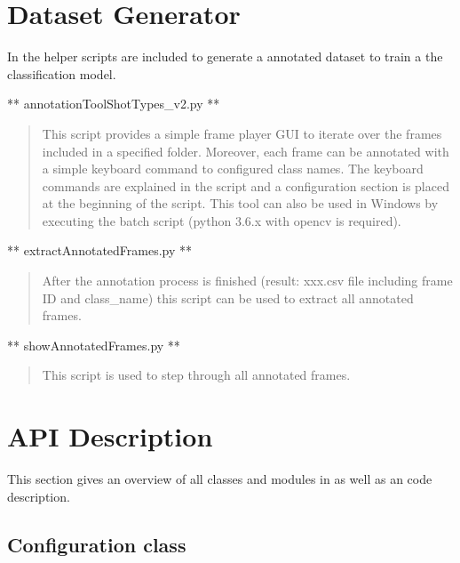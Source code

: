 \documentclass[letterpaper,10pt,english,openany,oneside]{sphinxmanual}
\begin{document}
\chapter{Dataset Generator}
\label{\detokenize{index:dataset-generator}}
In the  helper scripts are included to generate a annotated dataset to train
a the classification model.

** annotationToolShotTypes\_v2.py **
\begin{quote}

This script provides a simple frame player GUI to iterate over the frames included in a specified folder. Moreover,
each frame can be annotated with a simple keyboard command to configured class names. The keyboard commands are
explained in the script and a configuration section is placed at the beginning of the script. This tool can also be
used in Windows by executing the batch script (python 3.6.x with opencv is required).
\end{quote}

** extractAnnotatedFrames.py **
\begin{quote}

After the annotation process is finished (result: xxx.csv file including frame ID and class\_name) this script can be
used to extract all annotated frames.
\end{quote}

** showAnnotatedFrames.py **
\begin{quote}

This script is used to step through all annotated frames.
\end{quote}


\chapter{API Description}
\label{\detokenize{index:api-description}}
This section gives an overview of all classes and modules in  as well as an code description.


\section{Configuration class}
\label{\detokenize{Configuration:configuration-class}}\label{\detokenize{Configuration::doc}}
\end{document}
